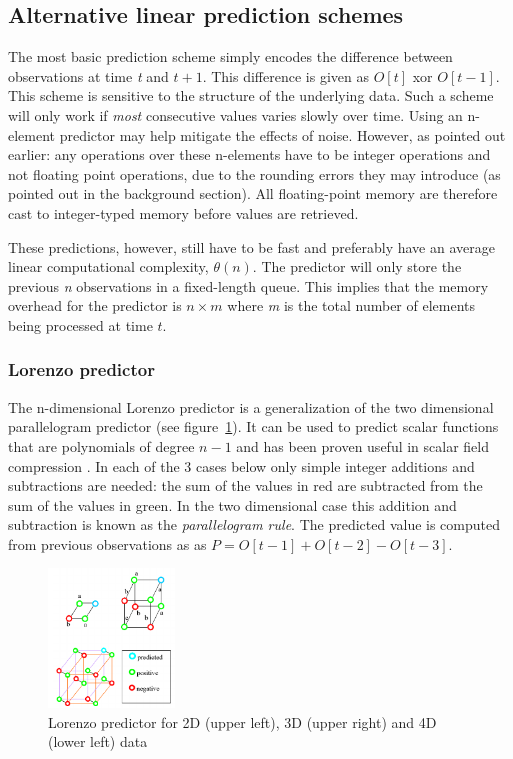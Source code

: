  \subsection{Alternative linear prediction schemes}
  The most basic prediction scheme simply encodes the difference between observations at time \textit{t} and $t+1$. This difference is given as $O[t]$ xor $O[t-1]$. This 
  scheme is sensitive to the structure of the underlying data. Such a scheme will only work if \emph{most} consecutive values varies slowly over time. Using an n-element 
  predictor may help mitigate the effects of noise. However, as pointed out earlier: any operations over these n-elements have to be integer operations and not 
  floating point operations, due to the rounding errors they may introduce (as pointed out in the background section). All floating-point memory are therefore cast to 
  integer-typed memory before values are retrieved.
  
  These predictions, however, still have to be fast and preferably have an average linear computational complexity, $\theta(n)$. The predictor will only 
  store the previous \textit{n} observations in a fixed-length queue. This implies that the memory overhead for the predictor is $n\times m$ where \textit{m} is 
  the total number of elements being processed at time $t$.
 \subsubsection{Lorenzo predictor}
 The n-dimensional Lorenzo predictor is a generalization of the two dimensional parallelogram predictor (see figure~\ref{LORENZO}). It can be used to predict scalar 
 functions that are polynomials of degree $n - 1$ and has been proven useful in scalar field compression \cite{CGF:CGF681}. In each of the 3 cases below only simple
 integer additions and subtractions are needed: the sum of the values in red are subtracted from the sum of the values in green. In the two dimensional case this 
 addition and subtraction is known as the \textit{parallelogram rule}. The predicted value is computed from previous observations as as $P = O[t-1] + O[t-2] - O[t-3]$.
  \begin{figure}[h!]
    \centering
    \includegraphics[width=0.3\textwidth]{lorenzo.png}
    \caption{Lorenzo predictor for 2D (upper left), 3D (upper right) and 4D (lower left) data \cite{CGF:CGF681}}
    \label{LORENZO}
  \end{figure} 
